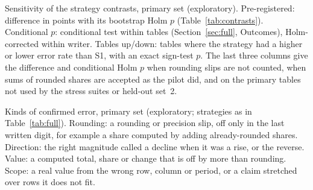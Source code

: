 \documentclass[11pt]{article}
\begin{document}
\begin{table}[t]
\centering
\caption{Sensitivity of the strategy contrasts, primary set (exploratory). Pre-registered: difference in points with its bootstrap Holm $p$ (Table~\ref{tab:contrasts}). Conditional $p$: conditional test within tables (Section~\ref{sec:full}, Outcomes), Holm-corrected within writer. Tables up/down: tables where the strategy had a higher or lower error rate than S1, with an exact sign-test $p$. The last three columns give the difference and conditional Holm $p$ when rounding slips are not counted, when sums of rounded shares are accepted as the pilot did, and on the \CleanTables{} primary tables not used by the stress suites or held-out set~2.}
\label{tab:sensitivity}

\end{table}

\begin{table}[t]
\centering
\caption{Kinds of confirmed error, primary set (exploratory; strategies as in Table~\ref{tab:full}). Rounding: a rounding or precision slip, off only in the last written digit, for example a share computed by adding already-rounded shares. Direction: the right magnitude called a decline when it was a rise, or the reverse. Value: a computed total, share or change that is off by more than rounding. Scope: a real value from the wrong row, column or period, or a claim stretched over rows it does not fit.}
\label{tab:errtypes}

\end{table}
\end{document}
